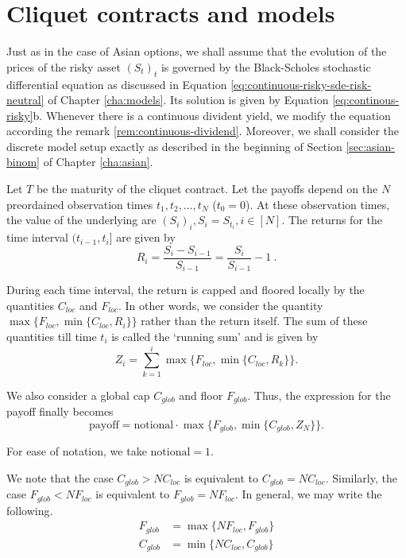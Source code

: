 \section{Cliquet contracts and models}
\label{sec:clq-models}

Just as in the case of Asian options, we shall assume that the evolution of the prices of the risky asset $ (S_t)_t $ is governed by the Black-Scholes stochastic differential equation as discussed in Equation \ref{eq:continuous-risky-sde-risk-neutral} of Chapter \ref{cha:models}. Its solution is given by Equation \ref{eq:continous-risky}b. Whenever there is a continuous divident yield, we modify the equation according the remark \ref{rem:continuous-dividend}. Moreover, we shall consider the discrete model setup exactly as described in the beginning of Section \ref{sec:asian-binom} of Chapter \ref{cha:asian}.


Let $T$ be the maturity of the cliquet contract. Let the payoffs depend on the $ N $ preordained observation times $ t_1, t_2, \dots, t_{N} $ ($ t_0 = 0 $). At these observation times, the value of the underlying are $ ( S_i )_i, S_i = S_{t_i}, i \in \left[ N \right] $. The returns for the time interval $ ( t_{i-1}, t_i ] $ are given by
\begin{equation}
	\label{eq:clq-return}
	R_i = \frac{S_i - S_{i-1}}{S_{i-1}} = \frac{S_i}{S_{i-1}} - 1 \ .
\end{equation}

During each time interval, the return is capped and floored locally by the quantities $ C_{loc} $ and $ F_{loc} $. In other words, we consider the quantity $ \max \{ F_{loc}, \min \{ C_{loc}, R_i \} \} $ rather than the return itself. The sum of these quantities till time $t_i$ is called the `running sum' and is given by
\begin{equation}
	\label{eq:clq-rsz}
	Z_i = \sum_{k = 1}^{i} \max \{ F_{loc}, \min \{ C_{loc}, R_k \} \}.
\end{equation}

We also consider a global cap $ C_{glob} $ and floor $ F_{glob} $. Thus, the expression for the payoff finally becomes
\begin{equation}
	\label{eq:clq-rsz}
	\mathrm{payoff} = \mathrm{notional} \cdot \max \{ F_{glob}, \min \{ C_{glob}, Z_{N} \} \}.
\end{equation}

For ease of notation, we take $ \mathrm{notional} = 1 $.

We note that the case $ C_{glob} > N C_{loc} $ is equivalent to $ C_{glob} = N C_{loc} $. Similarly, the case $ F_{glob} < N F_{loc} $ is equivalent to $ F_{glob} = N F_{loc} $. In general, we may write the following.
\begin{subequations}
	\label{eq:clq-update-glob}
	\begin{align*}
		F_{glob} &= \max \{ N F_{loc}, F_{glob} \}  \\
		C_{glob} &= \min \{ N C_{loc}, C_{glob} \}
	\end{align*}
\end{subequations}

